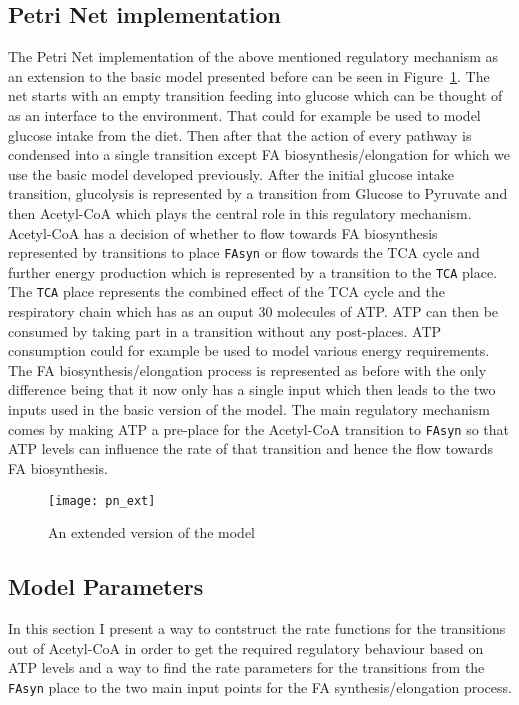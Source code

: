 \subsection{Petri Net implementation}
The Petri Net implementation of the above mentioned regulatory
mechanism as an extension to the basic model presented before can be
seen in Figure~\ref{fig:pn_ext}. The net starts with an empty
transition feeding into glucose which can be thought of as an
interface to the environment. That could for example be used to model
glucose intake from the diet. Then after that the action of every pathway
is condensed into a single transition except FA
biosynthesis/elongation for which we use the basic model developed
previously. After the initial glucose intake transition, glucolysis is
represented by a transition from Glucose to Pyruvate and then
Acetyl-CoA which plays the central role in this regulatory
mechanism. Acetyl-CoA has a decision of whether to flow towards FA
biosynthesis represented by transitions to place \texttt{FAsyn}
or flow towards the TCA cycle and further energy production which is
represented by a transition to the \texttt{TCA}
place. The \texttt{TCA}  place represents the combined
effect of the TCA cycle and the respiratory chain which has as an
ouput 30 molecules of ATP. ATP can then be consumed by taking part in
a transition without any post-places. ATP consumption could for
example be used to model various energy requirements. The FA biosynthesis/elongation
process is represented as before with the only difference
being that it now only has a single input which then leads to the two
inputs used in the basic version of the model. 
The main regulatory mechanism comes by making ATP a pre-place for the
Acetyl-CoA transition to \texttt{FAsyn} so that ATP levels can
influence the rate of that transition and hence the flow towards FA
biosynthesis. 

\begin{figure}[htbp!]
\centering
\texttt{[image: pn\_ext]}
\caption[Extended Petri Net model]{An extended version of the model}
\label{fig:pn_ext}
\end{figure}


\subsection{Model Parameters}
In this section I present a way to contstruct the
rate functions for the transitions out of Acetyl-CoA in order to get
the required regulatory behaviour based on ATP levels and a way to
find the rate parameters for the transitions from the \texttt{FAsyn} place
to the two main input points for the FA synthesis/elongation process.

